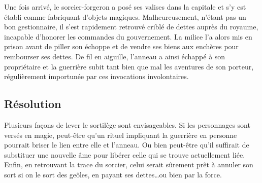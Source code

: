 \documentclass[a5paper,pagesize,10pt,bibliography=totoc,numbers=enddot,
headings=normal,DIV=9,twoside=false,tablecaptionabove]{scrbook}
\begin{document}
Une fois arrivé, le sorcier-forgeron a posé ses valises dans la capitale et s'y est établi comme fabriquant d'objets magiques.
Malheureusement, n'étant pas un bon gestionnaire, il s'est rapidement retrouvé criblé de dettes auprès du royaume, incapable d'honorer les commandes du gouvernement.
La milice l'a alors mis en prison avant de piller son échoppe et de vendre ses biens aux enchères pour rembourser ses dettes.
De fil en aiguille, l'anneau a ainsi échappé à son propriétaire et la guerrière subit tant bien que mal les aventures de son porteur, régulièrement importunée par ces invocations involontaires.

\subsection*{Résolution}

Plusieurs façons de lever le sortilège sont envisageables.
Si les personnages sont versés en magie, peut-être qu'un rituel impliquant la guerrière en personne pourrait briser le lien entre elle et l'anneau.
Ou bien peut-être qu'il suffirait de substituer une nouvelle âme pour libérer celle qui se trouve actuellement liée.
Enfin, en retrouvant la trace du sorcier, celui serait sûrement prêt à annuler son sort si on le sort des geôles, en payant ses dettes\dots ou bien par la force.


















\end{document}
